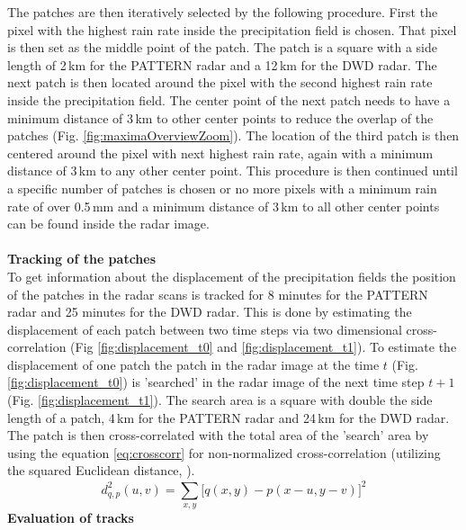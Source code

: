 \documentclass[11pt,twoside,a4paper,fleqn]{report}
\numberwithin{equation}{chapter}
\numberwithin{figure}{chapter}
\numberwithin{table}{chapter}
\begin{document}
The patches are then iteratively selected by the following procedure. First the pixel with the highest rain rate inside the precipitation field is chosen. That pixel is then set as the middle point of the patch. The patch is a square with a side length of 2\,km for the PATTERN radar and a 12\,km for the DWD radar. The next patch is then located around the pixel with the second highest rain rate inside the precipitation field. The center point of the next patch needs to have a  minimum distance of 3\,km to other center points to reduce the overlap of the patches (Fig. \ref{fig:maximaOverviewZoom}). The location of the third patch is then centered around the pixel with next highest rain rate, again with a minimum distance of 3\,km to any other center point. This procedure is then continued until a specific number of patches is chosen or no more pixels with a minimum rain rate of over 0.5\,mm and a minimum distance of 3\,km to all other center points can be found inside the radar image.\\\\
\textbf{Tracking of the patches} \\
To get information about the displacement of the precipitation fields the position of the patches in the radar scans is tracked for 8 minutes for the PATTERN radar and 25 minutes for the DWD radar. This is done by estimating the displacement of each patch between two time steps via two dimensional cross-correlation (Fig \ref{fig:displacement_t0} and \ref{fig:displacement_t1}). To estimate the displacement of one patch the patch in the radar image at the time $t$ (Fig. \ref{fig:displacement_t0}) is 'searched' in the radar image of the next time step $t + 1$ (Fig. \ref{fig:displacement_t1}). The search area is a square with double the side length of a patch, 4\,km for the PATTERN radar and 24\,km for the DWD radar. The patch is then cross-correlated with the total area of the 'search' area by using the equation  \ref{eq:crosscorr} for non-normalized cross-correlation (utilizing the squared Euclidean distance, \citealp{crosscorr}). 
\begin{equation}
d^2_{q,p}(u,v) = \sum_{x,y}^{}\big[q(x,y)-p(x-u,y-v)\big]^2
\label{eq:crosscorr}
\end{equation}
\textbf{Evaluation of tracks} \\
\end{document}
